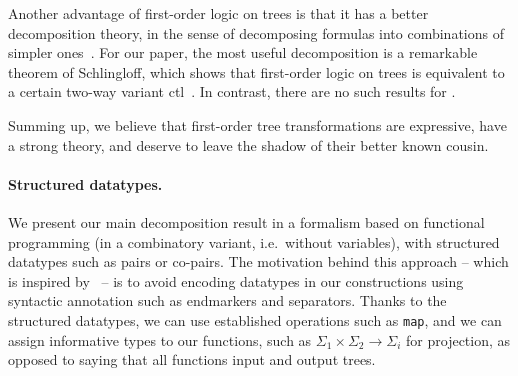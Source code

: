 Another advantage of first-order logic on trees is that it has a better decomposition theory, in the sense of decomposing formulas into combinations of simpler ones~\cite{haferthomas,bojanczykDecidablePropertiesTree2004,esik-weil1}. 
For our paper, the most useful decomposition is a remarkable theorem of Schlingloff, which shows that first-order logic on trees is equivalent to a certain two-way variant  {\sc ctl}~\cite[Theorem 4.5]{schlingloff1992expressive}. In contrast, there are no such results for \mso. 



Summing up, we believe that first-order  tree transformations are  expressive, have a strong theory, and deserve to leave the shadow of their better known \mso cousin.


\paragraph*{Structured datatypes.} We present our main decomposition result in a formalism based on  functional programming (in a combinatory variant, i.e.~without variables), with structured datatypes such as pairs or co-pairs.  The motivation behind this approach  -- which is inspired by~\cite{bojanczykRegularFirstOrderList2018} -- is to avoid encoding datatypes in our constructions using syntactic annotation such as endmarkers and separators. Thanks to the  structured datatypes,  we can use established operations such as {\tt map}, and we can assign informative types to our functions, such as $\Sigma_1 \times \Sigma_2 \to \Sigma_i$ for projection, as opposed to saying that all functions input and output trees.  

